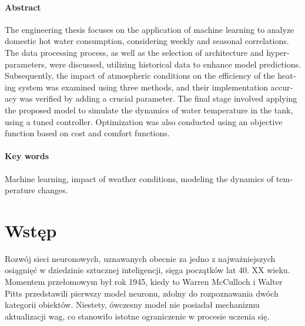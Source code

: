 \documentclass[a4paper,twoside,12pt]{book}
\newcounter{stronyPozaNumeracja}
\begin{document}
\subsubsection*{Abstract}
\begin{otherlanguage}{british}

  The engineering thesis focuses on the application of machine learning to analyze domestic hot water consumption, considering weekly and seasonal correlations. The data processing process, as well as the selection of architecture and hyperparameters, were discussed, utilizing historical data to enhance model predictions. Subsequently, the impact of atmospheric conditions on the efficiency of the heating system was examined using three methods, and their implementation accuracy was verified by adding a crucial parameter. The final stage involved applying the proposed model to simulate the dynamics of water temperature in the tank, using a tuned controller. Optimization was also conducted using an objective function based on cost and comfort functions.
\end{otherlanguage}
\subsubsection*{Key words}
\begin{otherlanguage}{british}
  Machine learning, impact of weather conditions, modeling the dynamics of temperature changes.
\end{otherlanguage}




\tableofcontents

\setcounter{stronyPozaNumeracja}{\value{page}}
\mainmatter
\pagestyle{empty}

\cleardoublepage

\pagestyle{NumeryStronNazwyRozdzialow}



\chapter{Wstęp}
\label{ch:wstep}
Rozwój sieci neuronowych, uznawanych obecnie za jedno z najważniejszych osiągnięć w dziedzinie sztucznej inteligencji, sięga początków lat 40. XX wieku. Momentem przełomowym był rok 1945, kiedy to Warren McCulloch i Walter Pitts przedstawili pierwszy model neuronu, zdolny do rozpoznawania dwóch kategorii obiektów. Niestety, ówczesny model nie posiadał mechanizmu aktualizacji wag, co stanowiło istotne ograniczenie w procesie uczenia się.
\end{document}
